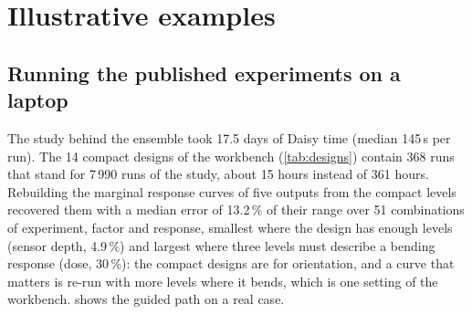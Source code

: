 \documentclass[preprint,12pt]{elsarticle}
\begin{document}
\section{Illustrative examples}
\subsection{Running the published experiments on a laptop}
The study behind the ensemble took 17.5 days of Daisy time (median 145\,s per run). The 14 compact designs of the workbench (\cref{tab:designs}) contain 368 runs that stand for 7\,990 runs of the study, about 15 hours instead of 361 hours. Rebuilding the marginal response curves of five outputs from the compact levels recovered them with a median error of 13.2\,\% of their range over 51 combinations of experiment, factor and response, smallest where the design has enough levels (sensor depth, 4.9\,\%) and largest where three levels must describe a bending response (dose, 30\,\%): the compact designs are for orientation, and a curve that matters is re-run with more levels where it bends, which is one setting of the workbench.  shows the guided path on a real case.
\end{document}
